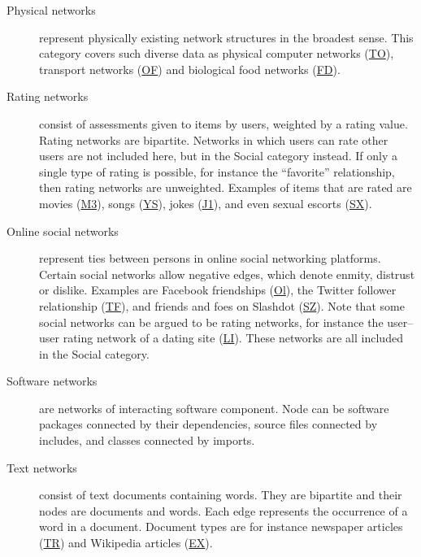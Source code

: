 \documentclass{article}
\begin{document}
\begin{description}
\item[Physical networks] represent physically existing network
   structures in the broadest sense.  This
  category covers such diverse data as physical computer networks
  (\href{http://konect.cc/networks/topology/}{\textsf{TO}}), transport
  networks
  (\href{http://konect.cc/networks/opsahl-openflights/}{\textsf{OF}}) and
  biological food networks
  (\href{http://konect.cc/networks/foodweb-baydry/}{\textsf{FD}}).

\item[Rating networks] consist of assessments given to items by users,
   weighted by a rating value.  Rating
  networks are bipartite.  Networks in which users can rate other users
  are not included here, but in the Social category instead.  If only a
  single type of rating is possible, for instance the ``favorite''
  relationship, then rating networks are unweighted.  Examples of items
  that are rated are movies
  (\href{http://konect.cc/networks/movielens-10m_rating/}{\textsf{M3}}),
  songs (\href{http://konect.cc/networks/yahoo-song/}{\textsf{YS}}),
  jokes (\href{http://konect.cc/networks/jester1/}{\textsf{J1}}), and even
  sexual escorts
  (\href{http://konect.cc/networks/escorts/}{\textsf{SX}}).

\item[Online social networks] represent ties between
   persons in online social networking
  platforms.  Certain social networks allow negative edges, which denote
  enmity, distrust or dislike.  Examples are Facebook friendships
  (\href{http://konect.cc/networks/facebook-wosn-links/}{\textsf{Ol}}),
  the
  Twitter follower relationship
  (\href{http://konect.cc/networks/twitter_mpi/}{\textsf{TF}}), and
  friends and foes on Slashdot
  (\href{http://konect.cc/networks/slashdot-zoo/}{\textsf{SZ}}).  Note
  that some social networks can be argued to be rating networks, for
  instance the user--user rating network of a dating site
  (\href{http://konect.cc/networks/libimseti/}{\textsf{LI}}).  These
  networks are all included in the Social category.

\item[Software networks] are networks of interacting software
   component.  Node can be software
  packages connected by their dependencies, source files connected by
  includes, and classes connected by imports.

\item[Text networks] consist of text documents containing words.  They
   are bipartite and their nodes are documents
  and words.  Each edge represents the occurrence of a word in a
  document. Document types are for instance newspaper articles
  (\href{http://konect.cc/networks/gottron-trec/}{\textsf{TR}}) and
  Wikipedia articles
  (\href{http://konect.cc/networks/gottron-excellent/}{\textsf{EX}}).


\end{description}
\end{document}
